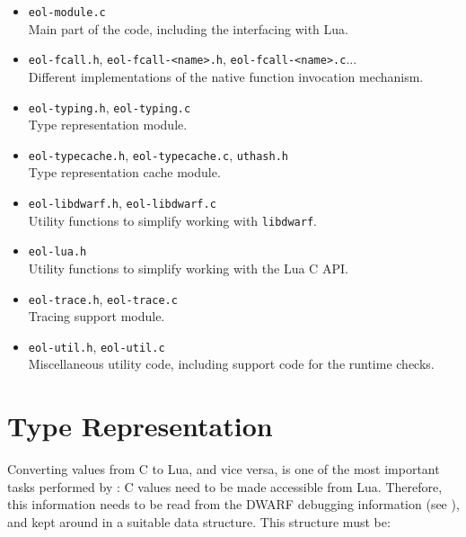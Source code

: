 \begin{itemize}

  \item \verb|eol-module.c| \hfill\\
    Main part of the code, including the interfacing with Lua.

  \item \verb|eol-fcall.h|,
        \verb|eol-fcall-<name>.h|,
        \verb|eol-fcall-<name>.c|... \hfill\\
    Different implementations of the native function invocation mechanism.

  \item \verb|eol-typing.h|, \verb|eol-typing.c| \hfill\\
    Type representation module.

  \item \verb|eol-typecache.h|, \verb|eol-typecache.c|, \verb|uthash.h| \hfill\\
    Type representation cache module.

  \item \verb|eol-libdwarf.h|, \verb|eol-libdwarf.c| \hfill\\
    Utility functions to simplify working with \verb|libdwarf|.

  \item \verb|eol-lua.h| \hfill\\
    Utility functions to simplify working with the Lua C API.

  \item \verb|eol-trace.h|, \verb|eol-trace.c| \hfill\\
    Tracing support module.

  \item \verb|eol-util.h|, \verb|eol-util.c| \hfill\\
    Miscellaneous utility code, including support code for the runtime checks.

\end{itemize}


\section{Type Representation}

Converting values from C to Lua, and vice versa, is one of the most important
tasks performed by \Eol*: C values need to be made accessible from Lua.
Therefore, this information needs to be read from the DWARF debugging
information (see ), and kept around in
a suitable data structure. This structure must be:

